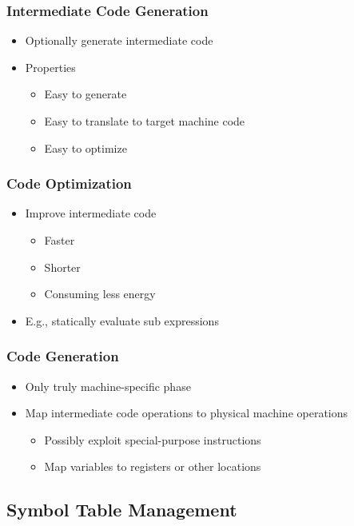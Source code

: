 \documentclass{scrartcl}
\begin{document}
\subsubsection{Intermediate Code Generation}

\begin{itemize}
	\item Optionally generate intermediate code
	\item Properties
	\begin{itemize}
		\item Easy to generate
		\item Easy to translate to target machine code
		\item Easy to optimize
	\end{itemize}
\end{itemize}

\subsubsection{Code Optimization}

\begin{itemize}
	\item Improve intermediate code
	\begin{itemize}
		\item Faster
		\item Shorter
		\item Consuming less energy
	\end{itemize}
	\item E.g., statically evaluate sub expressions
\end{itemize}

\subsubsection{Code Generation}

\begin{itemize}
	\item Only truly machine-specific phase
	\item Map intermediate code operations to physical machine operations
	\begin{itemize}
		\item Possibly exploit special-purpose instructions
		\item Map variables to registers or other locations
	\end{itemize}
\end{itemize}

\subsection{Symbol Table Management}
\end{document}
